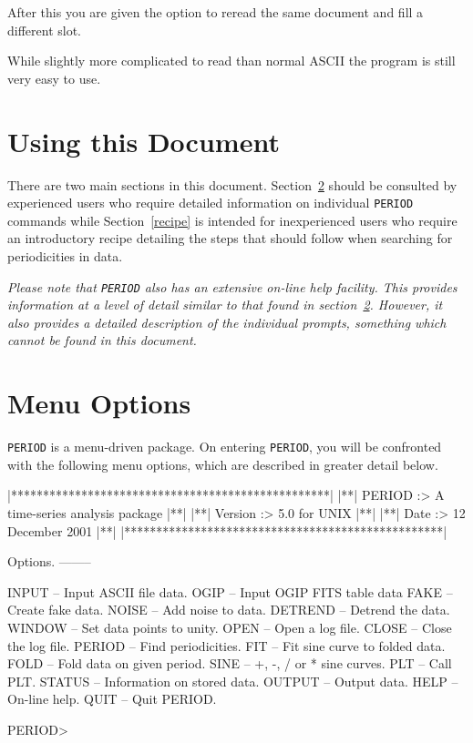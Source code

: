 \documentclass[twoside,11pt,noabs,nolof]{starlink}
\begin{document}
After this you are given the option to reread the same document and fill a
different slot.

While slightly more complicated to read than normal ASCII the
program is still very easy to use.

\section{Using this Document}

There are two main sections in this document.  Section~\ref{menu}
should be consulted by experienced users who require detailed
information on individual \texttt{PERIOD} commands while
Section~\ref{recipe} is intended for inexperienced users who require an
introductory recipe detailing the steps that should follow when
searching for periodicities in data.

\emph{Please note that \texttt{PERIOD} also has an extensive on-line help
facility.  This provides information at a level of detail similar to
that found in section~\ref{menu}. However, it also provides a detailed
description of the individual prompts, something which cannot be found
in this document.}

\section{Menu Options}
\label{menu}

\texttt{PERIOD} is a menu-driven package. On entering \texttt{PERIOD}, you will be
confronted with the following menu options, which are described in greater
detail below.

\begin{terminalv}
|**************************************************|
|**| PERIOD  :>  A time-series analysis package |**|
|**| Version :>  5.0 for UNIX                   |**|
|**| Date    :>  12 December 2001               |**|
|**************************************************|

Options.
--------

INPUT    --  Input ASCII file data.
OGIP     --  Input OGIP FITS table data
FAKE     --  Create fake data.
NOISE    --  Add noise to data.
DETREND  --  Detrend the data.
WINDOW   --  Set data points to unity.
OPEN     --  Open a log file.
CLOSE    --  Close the log file.
PERIOD   --  Find periodicities.
FIT      --  Fit sine curve to folded data.
FOLD     --  Fold data on given period.
SINE     --  +, -, / or * sine curves.
PLT      --  Call PLT.
STATUS   --  Information on stored data.
OUTPUT   --  Output data.
HELP     --  On-line help.
QUIT     --  Quit PERIOD.

PERIOD>
\end{terminalv}
\end{document}
